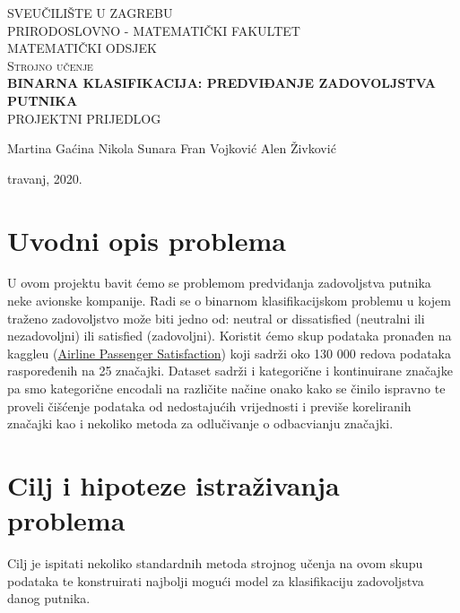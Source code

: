\documentclass[a4paper,12pt]{article}
\begin{document}
\begin{titlepage}
\begin{center}

\textsc{\large {SVEU\v{C}ILI\v{S}TE U ZAGREBU\\ PRIRODOSLOVNO - MATEMATIČKI FAKULTET\\  MATEMATIČKI ODSJEK}}\\[6.0cm]


\textsc{\Large {Strojno učenje}}\\[0.5cm]
\textsc{\huge\bfseries \Large BINARNA KLASIFIKACIJA: PREDVIĐANJE ZADOVOLJSTVA PUTNIKA} \\[1.0cm]
\textsc{\Large {PROJEKTNI PRIJEDLOG}}\\[0.5cm]

\vfill


\noindent
\begin{minipage}[t]{25cm}
\large{Martina Gaćina}\newline
\large{Nikola Sunara}\newline
\large{Fran Vojković}\newline
\large{Alen Živković}\newline
\end{minipage}

\large{travanj, 2020.}
\end{center}
\end{titlepage}

\section{Uvodni opis problema}
U ovom projektu bavit ćemo se problemom predviđanja zadovoljstva putnika neke avionske kompanije. Radi se o binarnom klasifikacijskom problemu u kojem traženo zadovoljstvo može biti jedno od: neutral or dissatisfied (neutralni ili nezadovoljni) ili satisfied (zadovoljni). Koristit ćemo skup podataka pronađen na kaggleu (\href{https://www.kaggle.com/teejmahal20/airline-passenger-satisfaction}{Airline Passenger Satisfaction}) koji sadrži oko 130 000 redova podataka raspoređenih na 25 značajki. Dataset sadrži i kategorične i kontinuirane značajke pa smo kategorične encodali na različite načine onako kako se činilo ispravno te proveli čišćenje podataka od nedostajućih vrijednosti i previše koreliranih značajki kao i nekoliko metoda za odlučivanje o odbacvianju značajki.

\newline
\section{Cilj i hipoteze istraživanja problema}
Cilj je ispitati nekoliko standardnih metoda strojnog učenja na ovom skupu podataka te konstruirati najbolji mogući model za klasifikaciju zadovoljstva danog putnika.
\newline
\end{document}
